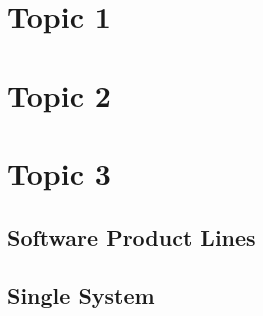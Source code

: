 

\subtitle{1. Introduction}
\author{Thomas Thüm}





\section{Topic 1}



\lessonslearned{
	\item \ldots
}{
	\item \ldots
}{
	\ldots
}

\sectionend

\section{Topic 2}



\lessonslearned{
	\item \ldots
}{
	\item \ldots
}{
	\ldots
}

\sectionend

\section{Topic 3}



\lessonslearned{
	\item \ldots
}{
	\item \ldots
}{
	\ldots
}



\subsection{Software Product Lines}

\subsection{Single System}


